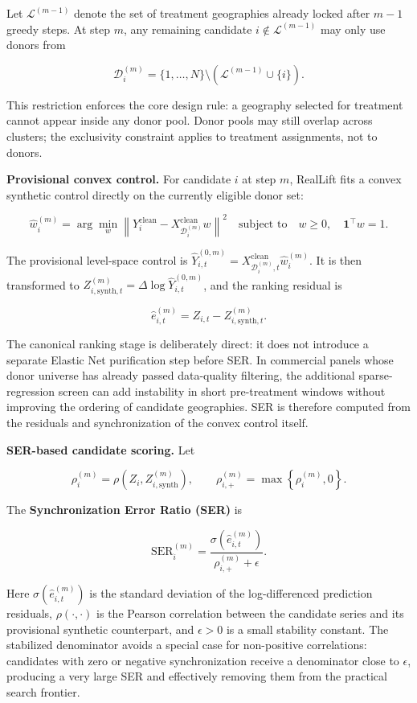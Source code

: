 \documentclass[11pt]{article}
\begin{document}
Let $\mathcal{L}^{(m-1)}$ denote the set of treatment geographies already locked after $m-1$ greedy steps. At step $m$, any remaining candidate $i \notin \mathcal{L}^{(m-1)}$ may only use donors from

\[
\mathcal{D}_i^{(m)} = \{1, \ldots, N\} \setminus \left( \mathcal{L}^{(m-1)} \cup \{i\} \right).
\]

This restriction enforces the core design rule: a geography selected for treatment cannot appear inside any donor pool. Donor pools may still overlap across clusters; the exclusivity constraint applies to treatment assignments, not to donors.

\textbf{Provisional convex control.} For candidate $i$ at step $m$, RealLift fits a convex synthetic control directly on the currently eligible donor set:

\[
\hat{w}_i^{(m)} = \arg\min_{w} \left\| Y_i^{\mathrm{clean}} - X_{\mathcal{D}_i^{(m)}}^{\mathrm{clean}} w \right\|^2
\quad \text{subject to} \quad w \geq 0, \quad \mathbf{1}^\top w = 1.
\]

The provisional level-space control is $\hat{Y}_{i,t}^{(0,m)} = X_{\mathcal{D}_i^{(m)},t}^{\mathrm{clean}} \hat{w}_i^{(m)}$. It is then transformed to $Z_{i,\mathrm{synth},t}^{(m)} = \Delta \log \hat{Y}_{i,t}^{(0,m)}$, and the ranking residual is

\[
\hat{e}_{i,t}^{(m)} = Z_{i,t} - Z_{i,\mathrm{synth},t}^{(m)}.
\]

The canonical ranking stage is deliberately direct: it does not introduce a separate Elastic Net purification step before SER. In commercial panels whose donor universe has already passed data-quality filtering, the additional sparse-regression screen can add instability in short pre-treatment windows without improving the ordering of candidate geographies. SER is therefore computed from the residuals and synchronization of the convex control itself.

\textbf{SER-based candidate scoring.} Let

\[
\rho_i^{(m)} = \rho\!\left(Z_i, Z_{i,\mathrm{synth}}^{(m)}\right),
\qquad
\rho_{i,+}^{(m)} = \max\left\{\rho_i^{(m)}, 0\right\}.
\]

The \textbf{Synchronization Error Ratio (SER)} is

\[
\mathrm{SER}_i^{(m)} =
\frac{\sigma\!\left(\hat{e}_{i,t}^{(m)}\right)}{\rho_{i,+}^{(m)} + \epsilon}.
\]

Here $\sigma(\hat{e}_{i,t}^{(m)})$ is the standard deviation of the log-differenced prediction residuals, $\rho(\cdot, \cdot)$ is the Pearson correlation between the candidate series and its provisional synthetic counterpart, and $\epsilon > 0$ is a small stability constant. The stabilized denominator avoids a special case for non-positive correlations: candidates with zero or negative synchronization receive a denominator close to $\epsilon$, producing a very large SER and effectively removing them from the practical search frontier.
\end{document}
